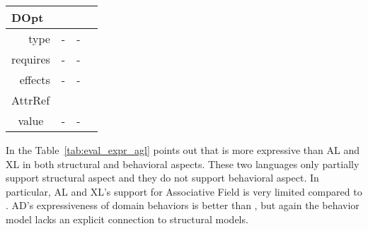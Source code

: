 \begin{minipage}{\textwidth}
\begin{tabular}{|rccl|}
		\multicolumn{4}{|l|}{\cellcolor[HTML]{DAE8FC}DOpt}                                                                                                                                                                                                                                                                    \\ \hline
		\multicolumn{1}{|r|}{type}              & \multicolumn{1}{c|}{-}                                                                                             & \multicolumn{1}{c|}{-}                                                                                                 &                               \\ \hline
		\multicolumn{1}{|r|}{requires}          & \multicolumn{1}{c|}{-}                                                                                             & \multicolumn{1}{c|}{-}                                                                                                 &                               \\ \hline
		\multicolumn{1}{|r|}{effects}           & \multicolumn{1}{c|}{-}                                                                                             & \multicolumn{1}{c|}{-}                                                                                                 &                               \\ \hline
		\multicolumn{4}{|l|}{\cellcolor[HTML]{DAE8FC}AttrRef}                                                                                                                                                                                                                                                                 \\ \hline
		\multicolumn{1}{|c|}{value}             & \multicolumn{1}{c|}{-}                                                                                             & \multicolumn{1}{c|}{-}                                                                                                 &                               \\ \hline
	
	\end{tabular}
	
\end{minipage}

	
	In the Table~\ref{tab:eval_expr_agl} points out that \agldcsl is more expressive than AL and XL in both structural and behavioral aspects. These two languages only partially support structural aspect and they do not support behavioral aspect. In particular, AL and XL's support for Associative Field is very limited compared to \agldcsl. AD's expressiveness of domain behaviors is better than \agl, but again the behavior model lacks an explicit connection to structural models.
	
